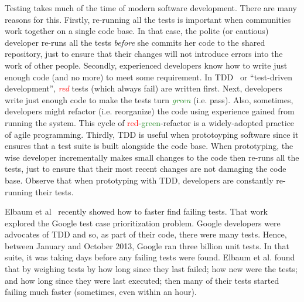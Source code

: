 \documentclass{NSF}
\begin{document}
\begin{nsfdescription}
 
Testing takes much of the time of modern software development. There are many reasons for this.
Firstly,
re-running all the tests is  important when communities work together on a single code
base. In that case, the polite (or cautious)  developer re-runs all the tests {\em before} she commits her code to the shared repository, just to ensure that their
changes will not introduce errors into the work of other people.
Secondly,  
experienced developers know how to write just enough code (and no more) to meet some requirement.
In
TDD~\cite{beck2003test} or ``test-driven development'',
 \textcolor{red}{\em red} tests (which always fail)
are written first. 
Next, developers write just enough code to make the tests turn  \textcolor{ForestGreen}{\em green} (i.e. pass). Also, sometimes,
developers  might refactor (i.e. reorganize) the code using  experience gained
from running the system. This cycle of \textcolor{red}{red}-\textcolor{ForestGreen}{green}-refactor is a widely-adopted practice
of agile programming. 
Thirdly, 
 TDD is  useful when prototoyping software
since it ensures that a test suite is built alongside the code base.
When prototyping,  the wise developer incrementally makes
small changes to the code then re-runs all the tests, just to ensure that their most recent changes are not damaging the code base. Observe that when prototyping with TDD, developers are 
constantly re-running their tests.


Elbaum et al~\cite{google} recently showed how to faster find failing tests. That work explored the Google test case prioritization problem. Google developers were advocates of TDD and so, as part of their
code, there were many tests.
Hence, between January and October 2013, Google ran three billion unit tests. In that suite,
it was taking days before any failing tests were found. Elbaum et al.
found that by  weighing tests by 
how long since they last failed;
how new were the tests;
and how long since they were last executed;
then  many of their tests started failing much faster (sometimes, even within an hour). 

\newpage





\end{nsfdescription}
\end{document}
